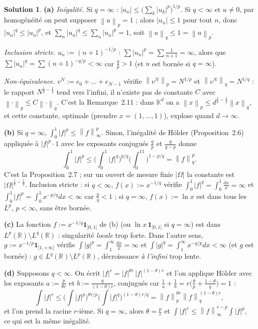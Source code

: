\documentclass[11pt,a4paper]{article}
\newcommand{\R}{\mathbb{R}}
\newcommand{\K}{\mathbb{K}}
\newcommand{\norm}[1]{\left\|#1\right\|}
\theoremstyle{definition}
\newtheorem*{solution}{Solution}
\begin{document}
\begin{solution}
\noindent\textbf{(a)} \emph{Inégalité.} Si $q=\infty$ : $|u_n|\le\big(\sum_k|u_k|^p\big)^{1/p}$. Si $q<\infty$ et $u\ne0$, par homogénéité on peut supposer $\norm u_p=1$ ; alors $|u_n|\le1$ pour tout $n$, donc $|u_n|^q\le|u_n|^p$, et $\sum_n|u_n|^q\le\sum_n|u_n|^p=1$, soit $\norm u_q\le1=\norm u_p$.

\emph{Inclusion stricte.} $u_n:=(n+1)^{-1/p}$ : $\sum|u_n|^p=\sum\frac1{n+1}=\infty$, alors que $\sum|u_n|^q=\sum(n+1)^{-q/p}<\infty$ car $\frac qp>1$ (et $u$ est bornée si $q=\infty$).

\emph{Non-équivalence.} $v^N:=e_0+\dots+e_{N-1}$ vérifie $\norm{v^N}_p=N^{1/p}$ et $\norm{v^N}_q=N^{1/q}$ : le rapport $N^{\frac1p-\frac1q}$ tend vers l'infini, il n'existe pas de constante $C$ avec $\norm\cdot_p\le C\norm\cdot_q$. C'est la Remarque~2.11 : dans $\K^d$ on a $\norm x_p\le d^{\frac1p-\frac1q}\norm x_q$, et cette constante, optimale (prendre $x=(1,\dots,1)$), explose quand $d\to\infty$.

\medskip
\noindent\textbf{(b)} Si $q=\infty$, $\int_0^1|f|^p\le\norm f_\infty^p$. Sinon, l'inégalité de Hölder (Proposition~2.6) appliquée à $|f|^p\cdot1$ avec les exposants conjugués $\frac qp$ et $\frac q{q-p}$ donne
\[
\int_0^1|f|^p\le\Big(\int_0^1|f|^q\Big)^{p/q}\Big(\int_0^11\Big)^{1-p/q}=\norm f_q^p .
\]
C'est la Proposition~2.7 ; sur un ouvert de mesure finie $|\Omega|$ la constante est $|\Omega|^{\frac1p-\frac1q}$. Inclusion stricte : si $q<\infty$, $f(x):=x^{-1/q}$ vérifie $\int_0^1|f|^q=\int_0^1\frac{dx}x=\infty$ et $\int_0^1|f|^p=\int_0^1x^{-p/q}dx<\infty$ car $\frac pq<1$ ; si $q=\infty$, $f(x):=\ln x$ est dans tous les $L^p$, $p<\infty$, sans être bornée.

\medskip
\noindent\textbf{(c)} La fonction $f:=x^{-1/q}\mathbf 1_{]0,1[}$ de (b) (ou $\ln x\,\mathbf 1_{]0,1[}$ si $q=\infty$) est dans $L^p(\R)\setminus L^q(\R)$ : singularité \emph{locale} trop forte. Dans l'autre sens, $g:=x^{-1/p}\mathbf 1_{]1,+\infty[}$ vérifie $\int|g|^p=\int_1^\infty\frac{dx}x=\infty$ et $\int|g|^q=\int_1^\infty x^{-q/p}dx<\infty$ (et $g$ est bornée) : $g\in L^q(\R)\setminus L^p(\R)$, décroissance \emph{à l'infini} trop lente.

\medskip
\noindent\textbf{(d)} Supposons $q<\infty$. On écrit $|f|^r=|f|^{\theta r}\,|f|^{(1-\theta)r}$ et l'on applique Hölder avec les exposants $a:=\frac p{\theta r}$ et $b:=\frac q{(1-\theta)r}$, conjugués car $\frac1a+\frac1b=r\big(\frac\theta p+\frac{1-\theta}q\big)=1$ :
\[
\int|f|^r\le\Big(\int|f|^p\Big)^{\theta r/p}\Big(\int|f|^q\Big)^{(1-\theta)r/q}=\norm f_p^{\theta r}\norm f_q^{(1-\theta)r} ,
\]
et l'on prend la racine $r$-ième. Si $q=\infty$, alors $\theta=\frac pr$ et $\int|f|^r\le\norm f_\infty^{r-p}\int|f|^p$, ce qui est la même inégalité.
\end{solution}
\end{document}
